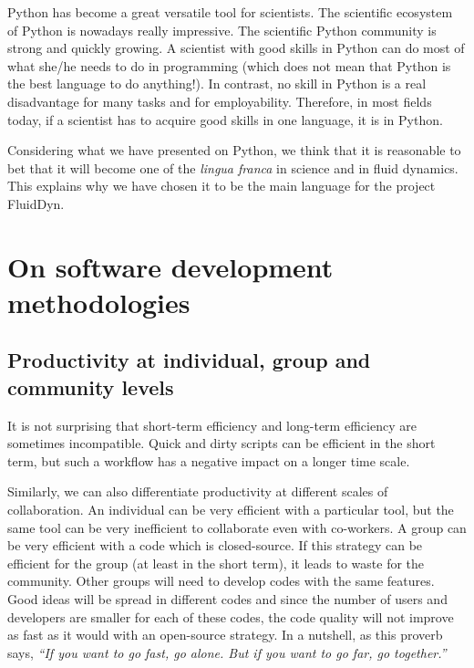 
Python has become a great versatile tool for scientists.  The scientific
ecosystem of Python is nowadays really impressive.  The scientific Python
community is strong and quickly growing.
%
A scientist with good skills in Python can do most of what she/he needs to do in
programming (which does not mean that Python is the best language to do
anything!).
%
In contrast, no skill in Python is a real disadvantage for many tasks and for
employability.
%
Therefore, in most fields today, if a scientist has to acquire good skills in
one language, it is in Python.

Considering what we have presented on Python, we think that it is reasonable to
bet that it will become one of the \textit{lingua franca} in science and in
fluid dynamics.  This explains why we have chosen it to be the main language
for the project FluidDyn.

\section{On software development methodologies}

\subsection{Productivity at individual, group and community levels}

It is not surprising
%
that short-term efficiency and long-term efficiency are
sometimes incompatible.
%
Quick and dirty scripts can be efficient in the short term, but such a workflow
has a negative impact on a longer time scale.

Similarly, we can also differentiate productivity at different scales of
collaboration.
%
An individual can be very efficient with a particular tool, but the same tool
can be very inefficient to collaborate even with co-workers.
%
A group can be very efficient with a code which is closed-source.  If this
strategy can be efficient for the group (at least in the short term), it leads
to waste for the community. Other groups will need to develop codes with the
same features.  Good ideas will be spread in different codes and since the
number of users and developers are smaller for each of these codes, the code
quality will not improve as fast as it would with an open-source strategy. In a
nutshell, as this proverb says, \textit{``If you want to go fast, go alone. But
if you want to go far, go together.''}

